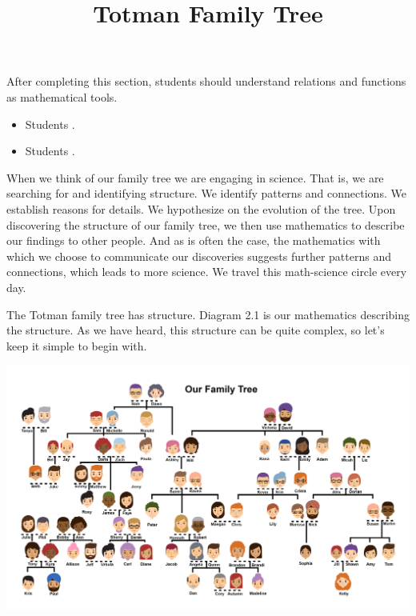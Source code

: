 \documentclass{ximera}
\title{Totman Family Tree}
\begin{document}
\begin{abstract}
\end{abstract}

\maketitle

\begin{sectionOutcomes}

After completing this section, students should understand relations and functions as mathematical tools. 

\begin{itemize}
\item Students .
\item Students .
\end{itemize}

\end{sectionOutcomes}











When we think of our family tree we are engaging in science. That is, we are searching for and identifying structure. We identify patterns and connections.  We establish reasons for details. We hypothesize on the evolution of the tree.  Upon discovering the structure of our family tree, we then use mathematics to describe our findings to other people. And as is often the case, the mathematics with which we choose to communicate our discoveries suggests further patterns and connections, which leads to more science. We travel this math-science circle every day.

The Totman family tree has structure. Diagram 2.1 is our mathematics describing the structure. As we have heard, this structure can be quite complex, so let's keep it simple to begin with. 

\begin{image}
\includegraphics{Totman_Family_Tree.png}
\end{image}
\end{document}
